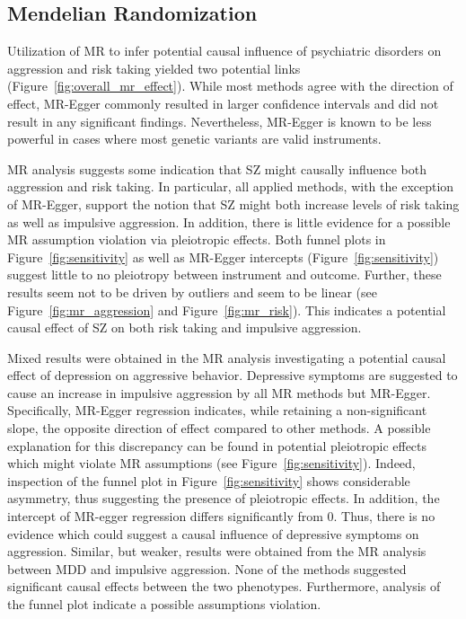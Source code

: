\subsection{Mendelian Randomization}
\label{sub:mendelian_randomization}

Utilization of MR to infer potential causal influence of psychiatric disorders on aggression and risk taking yielded two potential links (Figure~\ref{fig:overall_mr_effect}).
While most methods agree with the direction of effect, MR-Egger commonly resulted in larger confidence intervals and did not result in any significant findings.
Nevertheless, MR-Egger is known to be less powerful in cases where most  genetic variants are valid instruments.

MR analysis suggests some indication that SZ might causally influence both aggression and risk taking.
In particular, all applied methods, with the exception of MR-Egger, support the notion that SZ might both increase levels of risk taking as well as impulsive aggression.
In addition, there is little evidence for a possible MR assumption violation via pleiotropic effects.
Both funnel plots in Figure~\ref{fig:sensitivity} as well as MR-Egger intercepts (Figure~\ref{fig:sensitivity}) suggest little to no pleiotropy between instrument and outcome.
Further, these results seem not to be driven by outliers and seem to be linear (see Figure~\ref{fig:mr_aggression} and Figure~\ref{fig:mr_risk}).
This indicates a potential causal effect of SZ on both risk taking and impulsive aggression.

Mixed results were obtained in the MR analysis investigating a potential causal effect of depression on aggressive behavior.
Depressive symptoms are suggested to cause an increase in impulsive aggression by all MR methods but MR-Egger.
Specifically, MR-Egger regression indicates, while retaining a non-significant slope, the opposite direction of effect compared to other  methods.  
A possible explanation for this discrepancy can be found in potential pleiotropic effects which might violate MR assumptions (see Figure~\ref{fig:sensitivity}).
Indeed, inspection of the funnel plot in Figure~\ref{fig:sensitivity} shows considerable asymmetry, thus suggesting the presence of pleiotropic effects.
In addition, the intercept of MR-egger regression differs significantly from $0$.
Thus, there is no evidence which could suggest a causal influence of depressive symptoms on aggression. 
Similar, but weaker, results were obtained from the MR analysis between MDD and impulsive aggression.
None of the  methods suggested significant causal effects between the two phenotypes. 
Furthermore, analysis of the funnel plot indicate a possible assumptions violation.

